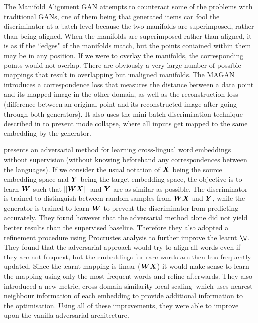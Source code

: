 The Manifold Alignment GAN \cite{magan} attempts to counteract some of the problems with traditional GANs, one of them being that generated items can fool the discriminator at a batch level because the two manifolds are superimposed, rather than being aligned. When the manifolds are superimposed rather than aligned, it is as if the ``edges" of the manifolds match, but the points contained within them may be in any position. If we were to overlay the manifolds, the corresponding points would not overlap. There are obviously a very large number of possible mappings that result in overlapping but unaligned manifolds. The MAGAN introduces a correspondence loss  that measures the distance between a data point and its mapped image in the other domain, as well as the reconstruction loss (difference between an original point and its reconstructed image after going through both generators). It also uses the mini-batch discrimination technique described in \cite{ImprovedTechniquesTrainingGANS} to prevent mode collapse, where all inputs get mapped to the same embedding by the generator. 

\cite{wordtranslationwithoutparalleldata} presents an adversarial method for learning cross-lingual word embeddings without supervision (without knowing beforehand any correspondences between the languages). If we consider the usual notation of $\boldsymbol{X}$ being the source embedding space and $\boldsymbol{Y}$ being the target embedding space, the objective is to learn $\boldsymbol{W}$ such that $||\boldsymbol{W} \boldsymbol{X}||$ and $\boldsymbol{Y}$ are as similar as possible. The discriminator is trained to distinguish between random samples from $\boldsymbol{W} \boldsymbol{X}$ and $\boldsymbol{Y}$, while the generator is trained to learn $\boldsymbol{W}$ to prevent the discriminator from predicting accurately. They found however that the adversarial method alone did not yield better results than the supervised baseline. Therefore they also adopted a refinement procedure using Procrustes analysis to further improve the learnt $\W$. They found that the adversarial approach would try to align all words even if they are not frequent, but the embeddings for rare words are then less frequently updated. Since the learnt mapping is linear ($\boldsymbol{W} \boldsymbol{X}$) it would make sense to learn the mapping using only the most frequent words and refine afterwards. They also introduced a new metric, cross-domain similarity local scaling, which uses nearest neighbour information of each embedding to provide additional information to the optimisation. Using all of these improvements, they were able to improve upon the vanilla adversarial architecture. 

